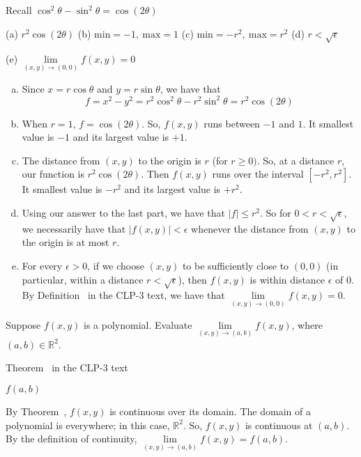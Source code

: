\begin{hint}
Recall $\cos^2\theta-\sin^2\theta=\cos(2\theta)$
\end{hint}
\begin{answer}
(a) $r^2\cos(2\theta)$\quad 
(b) $\text{min}=-1,\ \text{max}=1$\quad 
(c) $\text{min}=-r^2,\ \text{max}=r^2$\quad 
(d) $r<\sqrt\epsilon$ 

(e) $\lim\limits_{(x,y)\to(0,0)}f(x,y)=0$

\end{answer}
\begin{solution}
\begin{enumerate}[(a)]
\item Since $x=r\cos\theta$ and $y=r\sin\theta$, we have that 
\begin{equation*}
f=x^2-y^2=r^2\cos^2\theta-r^2\sin^2\theta=r^2\cos(2\theta)
\end{equation*}
\item 
When $r=1$, $f=\cos(2\theta)$. So, $f(x,y)$ runs between $-1$ and $1$.
It smallest value is $-1$ and its largest value is $+1$.
\item 
The distance from $(x,y)$ to the origin is $r$ (for $r\ge0)$. So, at a distance $r$, our function is $r^2\cos(2\theta)$. Then $f(x,y)$ runs over the interval $[-r^2,r^2]$. It smallest value is $-r^2$ and its largest value is $+r^2$.
\item 
Using our answer to the last part, we have that $|f|\le r^2$. So for $0<r<\sqrt\epsilon$, we necessarily have that $|f(x,y)|<\epsilon$ 
whenever the distance from $(x,y)$ to the origin is at most $r$.
\item 
For every $\epsilon>0$, if we choose $(x,y)$ to be sufficiently close to $(0,0)$ (in particular, within a distance $r<\sqrt\epsilon$), then $f(x,y)$ is 
within distance $\epsilon$ of $0$. By Definition~ 
in the CLP-3 text, we have that $\lim\limits_{(x,y)\to(0,0)}f(x,y)=0$.
\end{enumerate}

\end{solution}
\begin{question}
Suppose $f(x,y)$ is a polynomial. Evaluate $\lim\limits_{(x,y)\to(a,b)}f(x,y)$, where $(a,b)\in\mathbb R^2$.
\end{question}
\begin{hint}
Theorem~%
in the CLP-3 text
\end{hint}
\begin{answer}
$f(a,b)$
\end{answer}
\begin{solution}
By Theorem~,%
$f(x,y)$ is continuous over its domain. The domain of a polynomial is everywhere; in this case, $\mathbb R^2$. So, $f(x,y)$ is continuous at $(a,b)$. By the definition of continuity, $\lim\limits_{(x,y)\to(a,b)}f(x,y)=f(a,b)$.
\end{solution}
